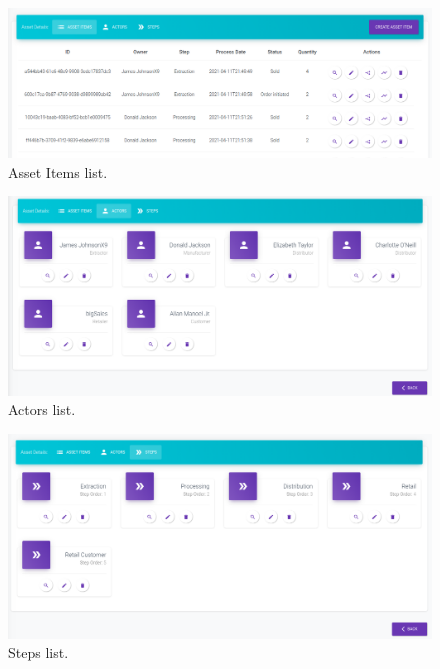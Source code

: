 \begin{figure}[H]
\begin{center}
  \includegraphics[scale=0.35]{images/use_example/06_asset_Item_list.png}
\caption{Asset Items list.}
\label{fig:asset_item_list}
\end{center}
\end{figure}

\begin{figure}[H]
\begin{center}
  \includegraphics[scale=0.34]{images/use_example/07_actor_list.png}
\caption{Actors list.}
\label{fig:actor_list}
\end{center}
\end{figure}

\begin{figure}[H]
\begin{center}
  \includegraphics[scale=0.34]{images/use_example/08_steps_list.png}
\caption{Steps list.}
\label{fig:step_list}
\end{center}
\end{figure}


